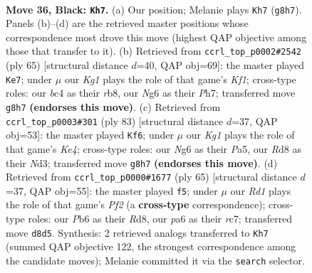 \documentclass[11pt]{article}
\begin{document}
\clearpage

\begin{figure}[p]\centering
\begin{subfigure}{0.46\textwidth}\centering
\resizebox{\linewidth}{!}{%
\newchessgame
\chessboard[
  setfen={3r2k1/p7/Pp4nb/5p2/2B1pP2/8/8/1RB1K3 b - - 5 36},
  showmover=false,
  pgfstyle=straightmove, color=movearrow, markmove={g8-h7}
]}
\caption{}
\end{subfigure}\hfill
\begin{subfigure}{0.46\textwidth}\centering
\resizebox{\linewidth}{!}{%
\newchessgame
\chessboard[
  setfen={1R3k2/6pp/5p2/4p3/2b1B2P/4P1K1/3r2P1/8 b - - 5 33},
  showmover=false,
  pgfstyle=straightmove, color=movearrow, markmove={f8-e7}
]}
\caption{}
\end{subfigure}
\\[4pt]
\begin{subfigure}{0.46\textwidth}\centering
\resizebox{\linewidth}{!}{%
\newchessgame
\chessboard[
  setfen={8/3b3r/1pp4P/p3k3/P7/2Pn4/4R1B1/2B3K1 b - - 20 42},
  showmover=false,
  pgfstyle=straightmove, color=movearrow, markmove={e5-f6}
]}
\caption{}
\end{subfigure}\hfill
\begin{subfigure}{0.46\textwidth}\centering
\resizebox{\linewidth}{!}{%
\newchessgame
\chessboard[
  setfen={3r4/2R2p2/4p1k1/n7/3bBB2/6P1/5P2/6K1 b - - 8 33},
  showmover=false,
  pgfstyle=straightmove, color=movearrow, markmove={f7-f5}
]}
\caption{}
\end{subfigure}
\caption{\textbf{Move 36, Black: \texttt{Kh7}.} (a) Our position; Melanie plays \texttt{Kh7} (\texttt{g8h7}). Panels (b)--(d) are the retrieved master positions whose correspondence most drove this move (highest QAP objective among those that transfer to it). (b) Retrieved from \texttt{ccrl\_top\_p0002\#2542} (ply 65) [structural distance $d$=40, QAP obj=69]: the master played \texttt{Ke7}; under $\mu$ our \emph{Kg1} plays the role of that game's \emph{Kf1}; cross-type roles: our \emph{b}c4 as their \emph{r}b8, our \emph{N}g6 as their \emph{P}h7; transferred move \texttt{g8h7} \textbf{(endorses this move)}. (c) Retrieved from \texttt{ccrl\_top\_p0003\#301} (ply 83) [structural distance $d$=37, QAP obj=53]: the master played \texttt{Kf6}; under $\mu$ our \emph{Kg1} plays the role of that game's \emph{Ke4}; cross-type roles: our \emph{N}g6 as their \emph{P}a5, our \emph{R}d8 as their \emph{N}d3; transferred move \texttt{g8h7} \textbf{(endorses this move)}. (d) Retrieved from \texttt{ccrl\_top\_p0000\#1677} (ply 65) [structural distance $d$=37, QAP obj=55]: the master played \texttt{f5}; under $\mu$ our \emph{Rd1} plays the role of that game's \emph{Pf2} (a \textbf{cross-type} correspondence); cross-type roles: our \emph{P}b6 as their \emph{R}d8, our \emph{p}a6 as their \emph{r}c7; transferred move \texttt{d8d5}. Synthesis: 2 retrieved analogs transferred to \texttt{Kh7} (summed QAP objective 122, the strongest correspondence among the candidate moves); Melanie committed it via the \texttt{search} selector.}
\label{fig:thought-m71}
\end{figure}
\end{document}
